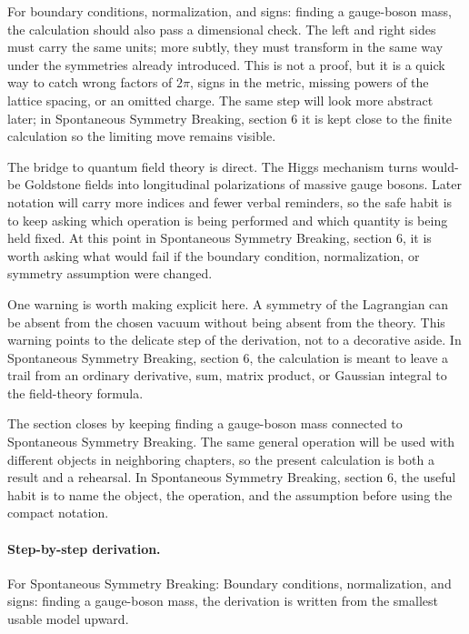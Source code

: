 For boundary conditions, normalization, and signs: finding a gauge-boson mass, the calculation should also pass a dimensional check.  The left and right sides must carry the same units; more subtly, they must transform in the same way under the symmetries already introduced.  This is not a proof, but it is a quick way to catch wrong factors of \(2\pi\), signs in the metric, missing powers of the lattice spacing, or an omitted charge.  The same step will look more abstract later; in Spontaneous Symmetry Breaking, section 6 it is kept close to the finite calculation so the limiting move remains visible.

The bridge to quantum field theory is direct.  The Higgs mechanism turns would-be Goldstone fields into longitudinal polarizations of massive gauge bosons.  Later notation will carry more indices and fewer verbal reminders, so the safe habit is to keep asking which operation is being performed and which quantity is being held fixed.  At this point in Spontaneous Symmetry Breaking, section 6, it is worth asking what would fail if the boundary condition, normalization, or symmetry assumption were changed.

One warning is worth making explicit here.  A symmetry of the Lagrangian can be absent from the chosen vacuum without being absent from the theory.  This warning points to the delicate step of the derivation, not to a decorative aside.  In Spontaneous Symmetry Breaking, section 6, the calculation is meant to leave a trail from an ordinary derivative, sum, matrix product, or Gaussian integral to the field-theory formula.

The section closes by keeping finding a gauge-boson mass connected to Spontaneous Symmetry Breaking.  The same general operation will be used with different objects in neighboring chapters, so the present calculation is both a result and a rehearsal.  In Spontaneous Symmetry Breaking, section 6, the useful habit is to name the object, the operation, and the assumption before using the compact notation.



\paragraph{Step-by-step derivation.}

For Spontaneous Symmetry Breaking: Boundary conditions, normalization, and signs: finding a gauge-boson mass, the derivation is written from the smallest usable model upward.

